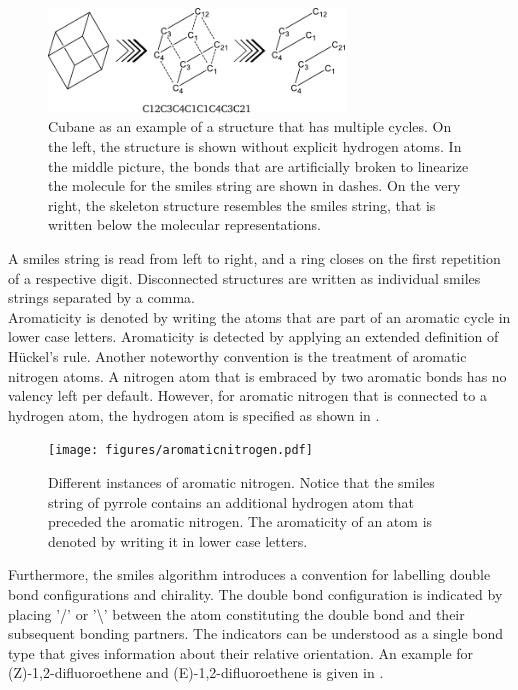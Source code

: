 \begin{figure}[H]
	\centering
	\includegraphics[width=0.7\textwidth]{figures/cubane.pdf}
	\caption[SMILES String that Resembles Multiple Cycles within the Same Molecule]{Cubane as an example of a structure that has multiple cycles. On the left, the structure is shown without explicit hydrogen atoms. In the middle picture, the bonds that are artificially broken to linearize the molecule for the \ac{smiles} string are shown in dashes. On the very right, the skeleton structure resembles the \ac{smiles} string, that is written below the molecular representations.\cite{Weininger1988}}
	\label{fig:cycles}
\end{figure}\noindent
A \ac{smiles} string is read from left to right, and a ring closes on the first repetition of a respective digit. Disconnected structures are written as individual \ac{smiles} strings separated by a comma. \cite{Weininger1988}\\
Aromaticity is denoted by writing the atoms that are part of an aromatic cycle in lower case letters. Aromaticity is detected by applying an extended definition of H\"uckel's rule. Another noteworthy convention is the treatment of aromatic nitrogen atoms. A nitrogen atom that is embraced by two aromatic bonds has no valency left per default. However, for aromatic nitrogen that is connected to a hydrogen atom, the hydrogen atom is specified as shown in .\cite{Weininger1988}
\begin{figure}[H]
	\centering
	\texttt{[image: figures/aromaticnitrogen.pdf]}
	\caption[Specifications for Aromatic Nitrogen within the \ac{smiles} algorithm]{Different instances of aromatic nitrogen. Notice that the \ac{smiles} string of pyrrole contains an additional hydrogen atom that preceded the aromatic nitrogen. The aromaticity of an atom is denoted by writing it in lower case letters.\cite{Weininger1988}}
	\label{fig:nitrogen}
\end{figure}\noindent
Furthermore, the \ac{smiles} algorithm introduces a convention for labelling double bond configurations and chirality. The double bond configuration is indicated by placing '/' or '\textbackslash' between the atom constituting the double bond and their subsequent bonding partners. The indicators can be understood as a single bond type that gives information about their relative orientation. An example for (Z)-1,2-difluoroethene and (E)-1,2-difluoroethene is given in .\cite{smilesmanual}
